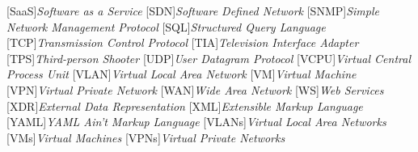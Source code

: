 \begin{acronym}[]
	[SaaS]{{\it Software as a Service}}
	[SDN]{{\it Software Defined Network}}
	[SNMP]{{\it Simple Network Management Protocol}}
	[SQL]{{\it Structured Query Language}}
	[TCP]{{\it Transmission Control Protocol}}
	[TIA]{{\it Television Interface Adapter}}
	[TPS]{{\it Third-person Shooter}}
	[UDP]{{\it User Datagram Protocol}}
	[VCPU]{{\it Virtual Central Process Unit}}
	[VLAN]{{\it Virtual Local Area Network}}
	[VM]{{\it Virtual Machine}}
	[VPN]{{\it Virtual Private Network}}
	[WAN]{{\it Wide Area Network}}
	[WS]{{\it Web Services}}
	[XDR]{{\it External Data Representation}}
	[XML]{{\it Extensible Markup Language}}
	[YAML]{{\it YAML Ain't Markup Language}}
	[VLANs]{{\it Virtual Local Area Networks}}
	[VMs]{{\it Virtual Machines}}
	[VPNs]{{\it Virtual Private Networks}}
\end{acronym}

